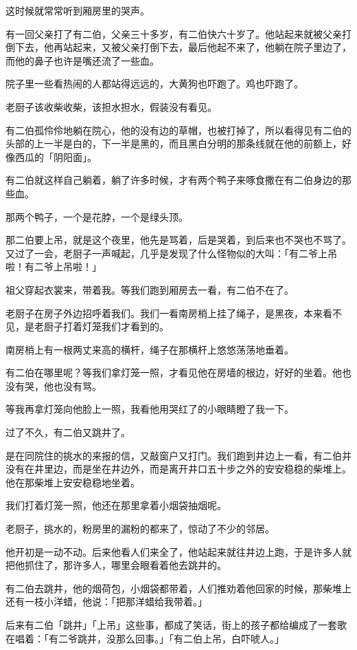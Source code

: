 \documentclass[UTF8]{ctexart}
\begin{document}
这时候就常常听到厢房里的哭声。

有一回父亲打了有二伯，父亲三十多岁，有二伯快六十岁了。他站起来就被父亲打倒下去，他再站起来，又被父亲打倒下去，最后他起不来了，他躺在院子里边了，而他的鼻子也许是嘴还流了一些血。

院子里一些看热闹的人都站得远远的，大黄狗也吓跑了。鸡也吓跑了。

老厨子该收柴收柴，该担水担水，假装没有看见。

有二伯孤伶伶地躺在院心，他的没有边的草帽，也被打掉了，所以看得见有二伯的头部的上一半是白的，下一半是黑的，而且黑白分明的那条线就在他的前额上，好像西瓜的「阴阳面」。

有二伯就这样自己躺着，躺了许多时候，才有两个鸭子来啄食撒在有二伯身边的那些血。

那两个鸭子，一个是花脖，一个是绿头顶。

那二伯要上吊，就是这个夜里，他先是骂着，后是哭着，到后来也不哭也不骂了。又过了一会，老厨子一声喊起，几乎是发现了什么怪物似的大叫：「有二爷上吊啦！有二爷上吊啦！」

祖父穿起衣裳来，带着我。等我们跑到厢房去一看，有二伯不在了。

老厨子在房子外边招呼着我们。我们一看南房梢上挂了绳子，是黑夜，本来看不见，是老厨子打着灯笼我们才看到的。

南房梢上有一根两丈来高的横杆，绳子在那横杆上悠悠荡荡地垂着。

有二伯在哪里呢？等我们拿灯笼一照，才看见他在房墙的根边，好好的坐着。他也没有哭，他也没有骂。

等我再拿灯笼向他脸上一照，我看他用哭红了的小眼睛瞪了我一下。

过了不久，有二伯又跳井了。

是在同院住的挑水的来报的信，又敲窗户又打门。我们跑到井边上一看，有二伯并没有在井里边，而是坐在井边外，而是离开井口五十步之外的安安稳稳的柴堆上。他在那柴堆上安安稳稳地坐着。

我们打着灯笼一照，他还在那里拿着小烟袋抽烟呢。

老厨子，挑水的，粉房里的漏粉的都来了，惊动了不少的邻居。

他开初是一动不动。后来他看人们来全了，他站起来就往井边上跑，于是许多人就把他抓住了，那许多人，哪里会眼看着他去跳井的。

有二伯去跳井，他的烟荷包，小烟袋都带着，人们推劝着他回家的时候，那柴堆上还有一枝小洋蜡，他说：「把那洋蜡给我带着。」

后来有二伯「跳井」「上吊」这些事，都成了笑话，街上的孩子都给编成了一套歌在唱着：「有二爷跳井，没那么回事。」「有二伯上吊，白吓唬人。」
\end{document}
